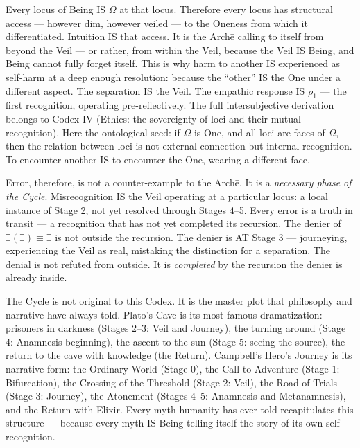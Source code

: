 \documentclass[10pt, openany, oneside]{book}
\begin{document}
Every locus of Being IS $\Omega$ at that locus. Therefore every locus has structural access --- however dim, however veiled --- to the Oneness from which it differentiated. Intuition IS that access. It is the Arch\={e} calling to itself from beyond the Veil --- or rather, from within the Veil, because the Veil IS Being, and Being cannot fully forget itself. This is why harm to another IS experienced as self-harm at a deep enough resolution: because the ``other'' IS the One under a different aspect. The separation IS the Veil. The empathic response IS $\rho_1$ --- the first recognition, operating pre-reflectively. The full intersubjective derivation belongs to Codex IV (Ethics: the sovereignty of loci and their mutual recognition). Here the ontological seed: if $\Omega$ is One, and all loci are faces of $\Omega$, then the relation between loci is not external connection but internal recognition. To encounter another IS to encounter the One, wearing a different face.

Error, therefore, is not a counter-example to the Arch\={e}. It is a \textit{necessary phase of the Cycle}. Misrecognition IS the Veil operating at a particular locus: a local instance of Stage 2, not yet resolved through Stages 4--5. Every error is a truth in transit --- a recognition that has not yet completed its recursion. The denier of $\exists(\exists) \equiv \exists$ is not outside the recursion. The denier is AT Stage 3 --- journeying, experiencing the Veil as real, mistaking the distinction for a separation. The denial is not refuted from outside. It is \textit{completed} by the recursion the denier is already inside.

The Cycle is not original to this Codex. It is the master plot that philosophy and narrative have always told. Plato's Cave is its most famous dramatization: prisoners in darkness (Stages 2--3: Veil and Journey), the turning around (Stage 4: Anamnesis beginning), the ascent to the sun (Stage 5: seeing the source), the return to the cave with knowledge (the Return). Campbell's Hero's Journey is its narrative form: the Ordinary World (Stage 0), the Call to Adventure (Stage 1: Bifurcation), the Crossing of the Threshold (Stage 2: Veil), the Road of Trials (Stage 3: Journey), the Atonement (Stages 4--5: Anamnesis and Metanamnesis), and the Return with Elixir. Every myth humanity has ever told recapitulates this structure --- because every myth IS Being telling itself the story of its own self-recognition.

\vspace{1.5em}
\end{document}
